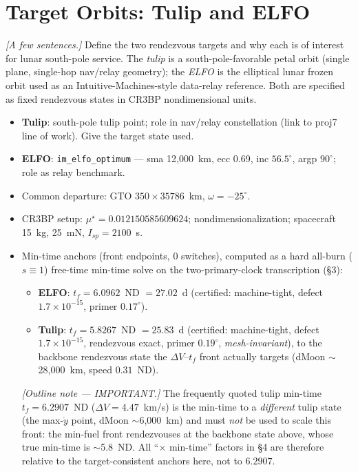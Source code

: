 \documentclass[11pt]{article}
\begin{document}
\section{Target Orbits: Tulip and ELFO}
\label{sec:constellation}
\emph{[A few sentences.]} Define the two rendezvous targets and why each is of
interest for lunar south-pole service. The \emph{tulip} is a south-pole-favorable
petal orbit (single plane, single-hop nav/relay geometry); the \emph{ELFO} is
the elliptical lunar frozen orbit used as an Intuitive-Machines-style data-relay
reference. Both are specified as fixed rendezvous states in CR3BP nondimensional
units.

\begin{itemize}
  \item \textbf{Tulip}: south-pole tulip point; role in nav/relay constellation
        (link to proj7 line of work). Give the target state used.
  \item \textbf{ELFO}: \texttt{im\_elfo\_optimum} --- sma 12{,}000~km, ecc 0.69,
        inc $56.5^\circ$, argp $90^\circ$; role as relay benchmark.
  \item Common departure: GTO $350\times35786$~km, $\omega=-25^\circ$.
  \item CR3BP setup: $\mu^\star = 0.012150585609624$; nondimensionalization;
        spacecraft 15~kg, 25~mN, $I_{sp}=2100$~s.
  \item Min-time anchors (front endpoints, 0 switches), computed as a hard
        all-burn ($s\equiv1$) free-time min-time solve on the two-primary-clock
        transcription (\S3):
        \begin{itemize}
          \item \textbf{ELFO}: $t_f=6.0962$~ND $=27.02$~d (certified: machine-tight,
                defect $1.7\times10^{-15}$, primer $0.17^\circ$).
          \item \textbf{Tulip}: $t_f=5.8267$~ND $=25.83$~d (certified:
                machine-tight, defect $1.7\times10^{-15}$, rendezvous exact,
                primer $0.19^\circ$, \emph{mesh-invariant}), to the backbone
                rendezvous state the $\Delta V$--$t_f$ front actually targets
                (dMoon $\sim$28{,}000~km, speed $0.31$~ND).
        \end{itemize}
        \emph{[Outline note --- IMPORTANT.]} The frequently quoted tulip min-time
        $t_f=6.2907$~ND ($\Delta V=4.47$~km/s) is the min-time to a \emph{different}
        tulip state (the max-$\dot y$ point, dMoon $\sim$6{,}000~km) and must
        \emph{not} be used to scale this front: the min-fuel front rendezvouses at
        the backbone state above, whose true min-time is $\sim$5.8~ND. All ``$\times$
        min-time'' factors in \S4 are therefore relative to the target-consistent
        anchors here, not to $6.2907$.
\end{itemize}
\end{document}
